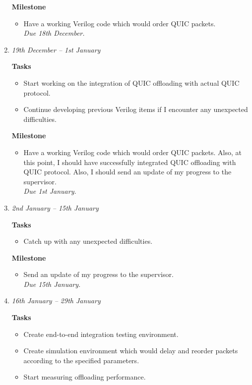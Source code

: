 \documentclass[a4paper,12pt]{article}
\begin{document}
\begin{enumerate}
\textbf{Milestone}
 \begin{itemize}
  \item Have a working Verilog code which would order QUIC packets.\\
  \emph{ Due 18th December. }
 \end{itemize}
 



 \item 
 \emph{19th December -- 1st January}

 \textbf{Tasks}
 \begin{itemize}
  \item Start working on the integration of QUIC offloading with actual QUIC protocol.
  \item Continue developing previous Verilog items if I encounter any unexpected difficulties.
 \end{itemize}

\textbf{Milestone}
 \begin{itemize}
  \item Have a working Verilog code which would order QUIC packets. Also, at this point, I should have successfully integrated QUIC offloading with QUIC protocol.
Also, I should send an update of my progress to the supervisor.\\
 \emph{ Due 1st January. }
 \end{itemize}
 


 \item 
 \emph{2nd January -- 15th January}

 \textbf{Tasks}
 \begin{itemize}
   \item Catch up with any unexpected difficulties.\\
 \end{itemize}

\textbf{Milestone}
 \begin{itemize}
   \item Send an update of my progress to the supervisor.\\
 \emph{ Due 15th January. }
 \end{itemize}

 


 \item 
 \emph{16th January -- 29th January}

\textbf{Tasks}
 \begin{itemize}
  \item Create end-to-end integration testing environment.
  \item Create simulation environment which would delay and reorder packets according to the specified parameters.
  \item Start measuring offloading performance.


\end{itemize}
\end{enumerate}
\end{document}
